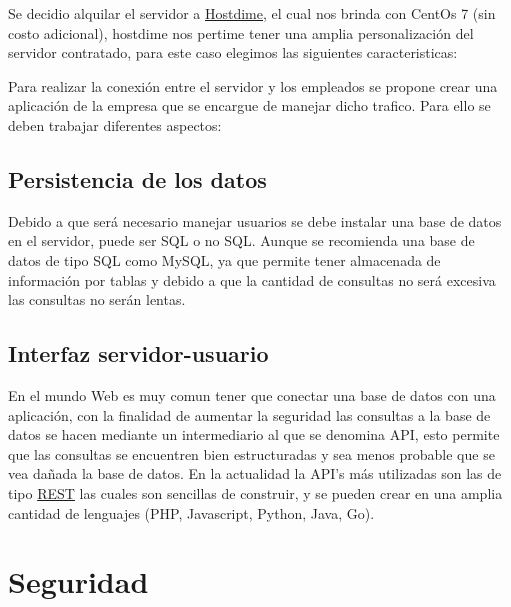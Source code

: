 \documentclass[11pt]{article}
\begin{document}
        Se decidio alquilar el servidor a \href{https://www.hostdime.com.ar/}{Hostdime}, el cual nos brinda con CentOs 7 (sin costo adicional), 
        hostdime nos pertime tener una amplia personalización del servidor contratado, para este caso elegimos las siguientes caracteristicas: 

        \begin{table}[H]
            \centering
            
        \end{table}

        Para realizar la conexión entre el servidor y los empleados se propone crear una aplicación de la empresa que se encargue de manejar dicho trafico. 
        Para ello se deben trabajar diferentes aspectos: 

        \subsection{Persistencia de los datos}

        Debido a que será necesario manejar usuarios se debe instalar una base de datos en el servidor, puede ser SQL o no SQL.
        Aunque se recomienda una base de datos de tipo SQL como MySQL, ya que permite tener almacenada de información por tablas 
        y debido a que la cantidad de consultas no será excesiva las consultas no serán lentas.
        
        

        \subsection{Interfaz servidor-usuario}

        En el mundo Web es muy comun tener que conectar una base de datos con una aplicación, con la finalidad de aumentar la seguridad las 
        consultas a la base de datos se hacen mediante un intermediario al que se denomina API, esto permite que las consultas 
        se encuentren bien estructuradas y sea menos probable que se vea dañada la base de datos. En la actualidad la API's más utilizadas son 
        las de tipo \href{https://rockcontent.com/es/blog/api-rest/#:~:text=Antes%20de%20introducir%20el%20concepto,comunicaci%C3%B3n%20de%20datos%20entre%20aplicaciones.}{REST} las cuales son sencillas de construir, y se pueden crear en una amplia cantidad de lenguajes (PHP, Javascript, Python, Java, Go).

    

    \section{Seguridad}
    
\end{document}

